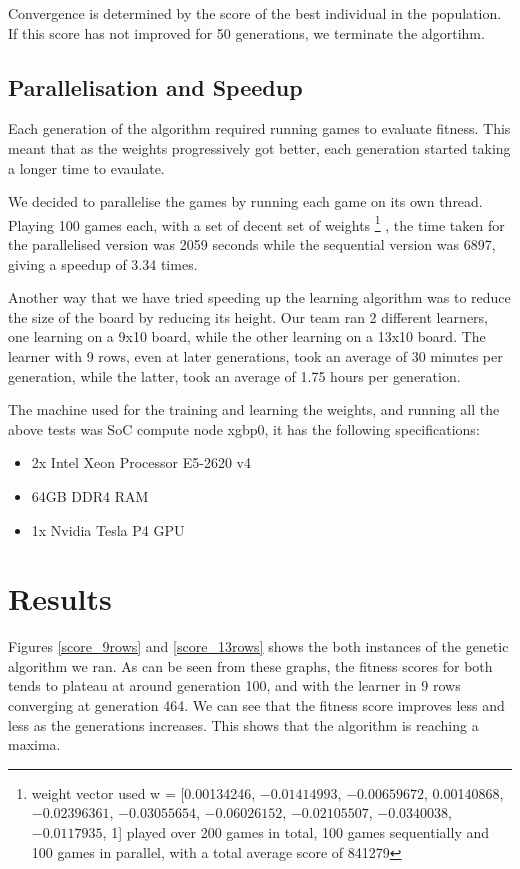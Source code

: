 \documentclass[a4paper,12pt,twocolumn]{article}
\begin{document}
Convergence is determined by the score of the best individual in the population.
If this score has not improved for 50 generations, we terminate the algortihm.

\subsection{Parallelisation and Speedup}
\label{parallelisation_n_speedup}
Each generation of the algorithm required running games to evaluate fitness. This
meant that as the weights progressively got better, each generation started
taking a longer time to evaulate.

We decided to parallelise the games by running each game on its own thread. Playing
100 games each, with a set of decent set of weights
\footnote{
    weight vector used w = [0.00134246, $-0.01414993$, $-0.00659672$, 0.00140868, $-0.02396361$, $-0.03055654$, $-0.06026152$, $-0.02105507$, $-0.0340038$, $-0.0117935$, 1]
    played over 200 games in total, 100 games sequentially and 100 games in parallel, with a total average score of 841279
}
, the time taken for the parallelised version was 2059 seconds while the
sequential version was 6897, giving a speedup of 3.34 times.

Another way that we have tried speeding up the learning algorithm was to reduce
the size of the board by reducing its height. Our team ran 2 different learners,
one learning on a 9x10 board, while the other learning on a 13x10 board.
The learner with 9 rows, even at later generations, took an average of 30 minutes
per generation, while the latter, took an average of 1.75 hours per generation.

The machine used for the training and learning the weights, and running all the
above tests was SoC compute node xgbp0, it has the following specifications:

\begin{itemize}
    \itemsep0em
    \item 2x Intel Xeon Processor E5-2620 v4
    \item 64GB DDR4 RAM
    \item 1x Nvidia Tesla P4 GPU
\end{itemize}

\section{Results}

Figures \ref{score_9rows} and \ref{score_13rows} shows the both instances of the
genetic algorithm we ran. As can be seen from these graphs, the fitness scores
for both tends to plateau at around generation 100, and with the learner in 9
rows converging at generation 464. We can see that the fitness score improves
less and less as the generations increases. This shows that the algorithm is
reaching a maxima.
\end{document}
